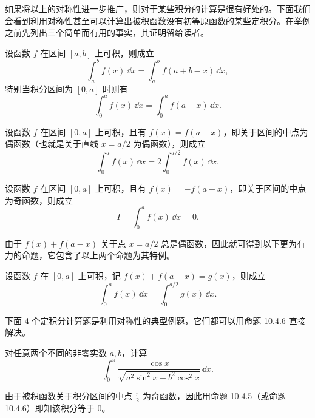 如果将以上的对称性进一步推广，则对于某些积分的计算是很有好处的。下面我们会看到利用对称性甚至可以计算出被积函数没有初等原函数的某些定积分。在举例之前先列出三个简单而有用的事实，其证明留给读者。

\begin{xtheorem}[10.4.3]
设函数 $f$ 在区间 $[a,b]$ 上可积，则成立
\[
  \int_a^b f(x)\,\dd x=\int_a^b f(a+b-x)\,\dd x,
\]
特别当积分区间为 $[0,a]$ 时则有
\[
  \int_0^a f(x)\,\dd x=\int_0^a f(a-x)\,\dd x.
\]
\end{xtheorem}

\begin{xtheorem}[10.4.4]
设函数 $f$ 在区间 $[0,a]$ 上可积，且有 $f(x)=f(a-x)$，即关于区间的中点为偶函数（也就是关于直线 $x=a/2$ 为偶函数），则成立
\[
  \int_0^a f(x)\,\dd x=2\int_0^{a/2}f(x)\,\dd x.
\]
\end{xtheorem}

\begin{xtheorem}[10.4.5]
设函数 $f$ 在区间 $[0,a]$ 上可积，且有 $f(x)=-f(a-x)$，即关于区间的中点为奇函数，则成立
\[
  I=\int_0^a f(x)\,\dd x=0.
\]
\end{xtheorem}

由于 $f(x)+f(a-x)$ 关于点 $x=a/2$ 总是偶函数，因此就可得到以下更为有力的命题，它包含了以上两个命题为其特例。

\begin{xtheorem}[10.4.6]
设函数 $f$ 在 $[0,a]$ 上可积，记 $f(x)+f(a-x)=g(x)$，则成立
\[
  \int_0^a f(x)\,\dd x=\int_0^{a/2}g(x)\,\dd x.
\]
\end{xtheorem}

下面 4 个定积分计算题是利用对称性的典型例题，它们都可以用命题 10.4.6 直接解决。

\begin{xexample}[10.4.5]
对任意两个不同的非零实数 $a,b$，计算
\[
  \int_0^\pi\frac{\cos x}{\sqrt{a^2\sin^2x+b^2\cos^2x}}\,\dd x.
\]
\end{xexample}
\begin{xsolution}
由于被积函数关于积分区间的中点 $\frac\pi2$ 为奇函数，因此用命题 10.4.5（或命题 10.4.6）即知该积分等于 0。
\end{xsolution}

